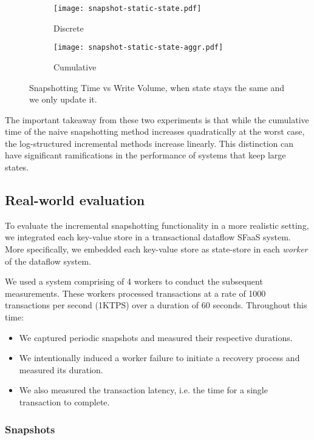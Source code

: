 \begin{figure}[h]
    \begin{subfigure}{.5\textwidth}
        \centering
        \texttt{[image: snapshot-static-state.pdf]}
        \caption{Discrete}
    \end{subfigure}
    \begin{subfigure}{.5\textwidth}
        \centering
        \texttt{[image: snapshot-static-state-aggr.pdf]}
        \caption{Cumulative}
    \end{subfigure}
    \caption{Snapshotting Time vs Write Volume, when state stays the same and we only update it.}
    \label{fig:snapshot-static-state}
\end{figure}

The important takeaway from these two experiments is that while the cumulative time of the naive snapshotting method increases quadratically at the worst case, the log-structured incremental methods increase linearly. This distinction can have significant ramifications in the performance of systems that keep large states.

\subsection{Real-world evaluation}
\label{section-real-world-evaluation}

To evaluate the incremental snapshotting functionality in a more realistic setting, we integrated each key-value store in a transactional dataflow SFaaS system. More specifically, we embedded each key-value store as state-store in each \textit{worker} of the dataflow system.

We used a system comprising of 4 workers to conduct the subsequent measurements. These workers processed transactions at a rate of 1000 transactions per second (1KTPS) over a duration of 60 seconds. Throughout this time:

\begin{itemize}
    \item We captured periodic snapshots and measured their respective durations.
    \item We intentionally induced a worker failure to initiate a recovery process and measured its duration.
    \item We also measured the transaction latency, i.e. the time for a single transaction to complete.
\end{itemize}

\subsubsection{Snapshots}

